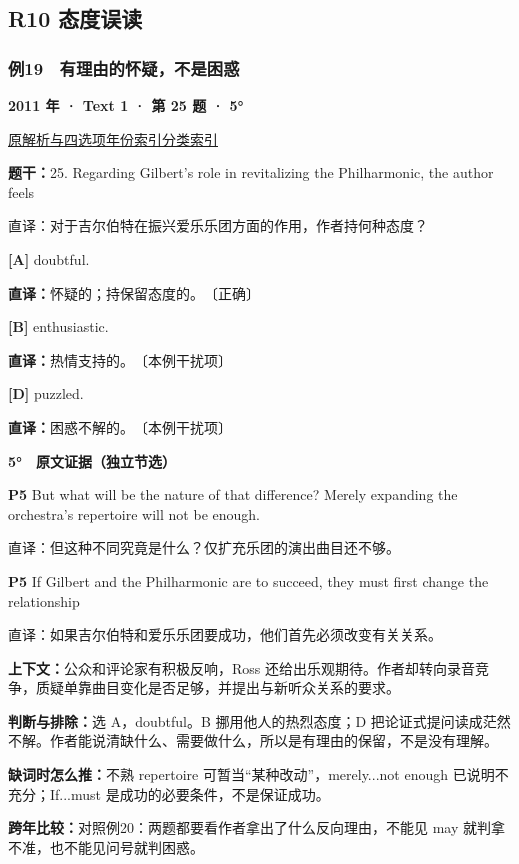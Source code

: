 \documentclass[11pt,a4paper]{article}
\begin{document}
\subsection{R10 态度误读}
\subsubsection{例19　有理由的怀疑，不是困惑}\label{case-2011-T1-Q25}
\noindent\textbf{2011 年 · Text 1 · 第 25 题 · 5°}\par\noindent \href{https://zj139.github.io/math-notes/english/9de80db7356ff635cec8a286/\#q25}{原解析与四选项}\quad \hyperref[idx-2011-T1-Q25]{年份索引}\quad \hyperref[class-R10]{分类索引}\par\smallskip
\noindent\textbf{题干：}25. Regarding Gilbert's role in revitalizing the Philharmonic, the author feels\par
直译：对于吉尔伯特在振兴爱乐乐团方面的作用，作者持何种态度？\par
{}\noindent\textbf{[A]} doubtful.\par\nopagebreak
\noindent\textbf{直译：}怀疑的；持保留态度的。　〔正确〕\par
{}\noindent\textbf{[B]} enthusiastic.\par\nopagebreak
\noindent\textbf{直译：}热情支持的。　〔本例干扰项〕\par
{}\noindent\textbf{[D]} puzzled.\par\nopagebreak
\noindent\textbf{直译：}困惑不解的。　〔本例干扰项〕\par
\begin{evidence}\textbf{5°　原文证据（独立节选）}\par
\textbf{P5} But what will be the nature of that difference? Merely expanding the orchestra's repertoire will not be enough.\par 直译：但这种不同究竟是什么？仅扩充乐团的演出曲目还不够。\par
\textbf{P5} If Gilbert and the Philharmonic are to succeed, they must first change the relationship\par 直译：如果吉尔伯特和爱乐乐团要成功，他们首先必须改变有关关系。\par
\end{evidence}
\noindent\textbf{上下文：}公众和评论家有积极反响，Ross 还给出乐观期待。作者却转向录音竞争，质疑单靠曲目变化是否足够，并提出与新听众关系的要求。\par
\noindent\textbf{判断与排除：}选 A，doubtful。B 挪用他人的热烈态度；D 把论证式提问读成茫然不解。作者能说清缺什么、需要做什么，所以是有理由的保留，不是没有理解。\par
\noindent\textbf{缺词时怎么推：}不熟 repertoire 可暂当“某种改动”，merely...not enough 已说明不充分；If...must 是成功的必要条件，不是保证成功。\par
\noindent\textbf{跨年比较：}对照例20：两题都要看作者拿出了什么反向理由，不能见 may 就判拿不准，也不能见问号就判困惑。\par
\clearpage
\end{document}
